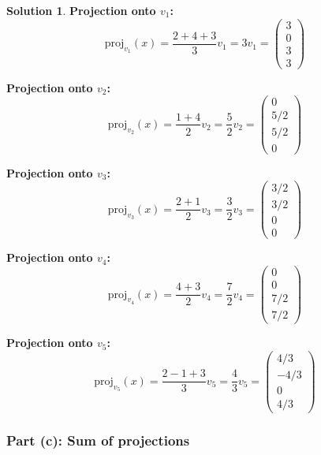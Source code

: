 \documentclass[12pt]{article}
\theoremstyle{definition}
\newtheorem{solution}{Solution}
\begin{document}
\begin{solution}
\textbf{Projection onto $v_1$:}
\[
\text{proj}_{v_1}(x) = \frac{2 + 4 + 3}{3} v_1 = 3v_1 = \begin{pmatrix} 3 \\ 0 \\ 3 \\ 3 \end{pmatrix}
\]

\textbf{Projection onto $v_2$:}
\[
\text{proj}_{v_2}(x) = \frac{1 + 4}{2} v_2 = \frac{5}{2} v_2 = \begin{pmatrix} 0 \\ 5/2 \\ 5/2 \\ 0 \end{pmatrix}
\]

\textbf{Projection onto $v_3$:}
\[
\text{proj}_{v_3}(x) = \frac{2 + 1}{2} v_3 = \frac{3}{2} v_3 = \begin{pmatrix} 3/2 \\ 3/2 \\ 0 \\ 0 \end{pmatrix}
\]

\textbf{Projection onto $v_4$:}
\[
\text{proj}_{v_4}(x) = \frac{4 + 3}{2} v_4 = \frac{7}{2} v_4 = \begin{pmatrix} 0 \\ 0 \\ 7/2 \\ 7/2 \end{pmatrix}
\]

\textbf{Projection onto $v_5$:}
\[
\text{proj}_{v_5}(x) = \frac{2 - 1 + 3}{3} v_5 = \frac{4}{3} v_5 = \begin{pmatrix} 4/3 \\ -4/3 \\ 0 \\ 4/3 \end{pmatrix}
\]
\end{solution}

\subsubsection*{Part (c): Sum of projections}
\end{document}

